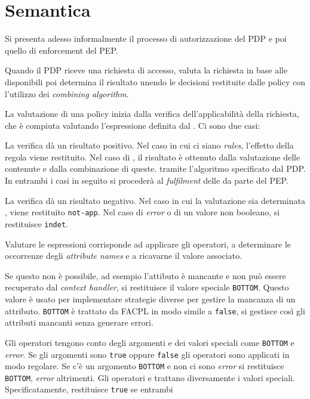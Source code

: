 \section{Semantica}
\label{sec:sem_fpl}
Si presenta adesso informalmente il processo di autorizzazione del PDP e poi quello di enforcement del PEP.\par
Quando il PDP riceve una richiesta di accesso, valuta la richiesta in base alle \epolicy disponibili poi determina
il risultato unendo le decisioni restituite dalle policy con l'utilizzo dei \emph{combining algorithm}.\par
La valutazione di una policy inizia dalla verifica dell'applicabilità della richiesta, che è compiuta valutando
l'espressione definita dal \etarget. Ci sono due casi:
\begin{description}
  \item La verifica dà un risultato positivo. Nel caso in cui ci siano \emph{rules}, l'effetto della regola viene restituito.
        Nel caso di \ePolicySet, il risultato è ottenuto dalla valutazione delle \epolicy contenute e dalla combinazione di queste.
        tramite l'algoritmo specificato dal PDP. In entrambi i casi in seguito si procederà al \emph{fulfilment} delle
        \eobligation da parte del PEP.
  \item La verifica dà un risultato negativo. Nel caso in cui la valutazione sia determinata \efalse, viene restituito
        \texttt{not-app}. Nel caso di \emph{error} o di un valore non booleano, si restituisce \texttt{indet}.
\end{description}
Valutare le espressioni corrisponde ad applicare gli operatori, a determinare le occorrenze degli \emph{attribute names} e
a ricavarne il valore associato.\par
Se questo non è possibile, ad esempio l'attibuto è mancante e non può essere recuperato dal \emph{context handler}, si
restituisce il valore speciale \texttt{BOTTOM}. Questo valore è usato per implementare strategie diverse per gestire
la mancanza di un attributo. \texttt{BOTTOM} è trattato da FACPL in modo simile a \texttt{false}, si gestisce
così gli attributi mancanti senza generare errori.\par
Gli operatori tengono conto degli argomenti e dei valori speciali come \texttt{BOTTOM} e \emph{error}.
Se gli argomenti sono \texttt{true} oppure \texttt{false} gli operatori sono applicati in modo regolare.
Se c'è un argomento \texttt{BOTTOM} e non ci sono \emph{error} si restituisce \texttt{BOTTOM}, \emph{error} altrimenti.
Gli operatori \eand e \eor trattano diversamente i valori speciali. Specificatamente, \eand restituisce \texttt{true} se entrambi
